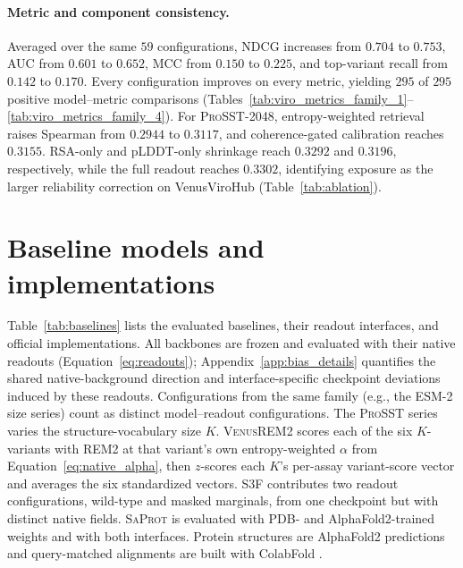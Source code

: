 \documentclass{article} %
\begin{document}
\paragraph{Metric and component consistency.}
Averaged over the same $59$ configurations, NDCG increases from $0.704$ to $0.753$, AUC from $0.601$ to $0.652$, MCC from $0.150$ to $0.225$, and top-variant recall from $0.142$ to $0.170$. Every configuration improves on every metric, yielding $295$ of $295$ positive model--metric comparisons (Tables~\ref{tab:viro_metrics_family_1}--\ref{tab:viro_metrics_family_4}). For \textsc{ProSST}-2048, entropy-weighted retrieval raises Spearman from $0.2944$ to $0.3117$, and coherence-gated calibration reaches $0.3155$. RSA-only and pLDDT-only shrinkage reach $0.3292$ and $0.3196$, respectively, while the full readout reaches $0.3302$, identifying exposure as the larger reliability correction on VenusViroHub (Table~\ref{tab:ablation}).

\FloatBarrier
\section{Baseline models and implementations}
\label{app:baselines}

Table~\ref{tab:baselines} lists the evaluated baselines, their readout interfaces, and official implementations. All backbones are frozen and evaluated with their native readouts (Equation~\ref{eq:readouts}); Appendix~\ref{app:bias_details} quantifies the shared native-background direction and interface-specific checkpoint deviations induced by these readouts. Configurations from the same family (e.g., the \textsc{ESM-2} size series) count as distinct model--readout configurations. The \textsc{ProSST} series varies the structure-vocabulary size $K$. \textsc{VenusREM2} scores each of the six $K$-variants with \textsc{REM2} at that variant's own entropy-weighted $\alpha$ from Equation~\ref{eq:native_alpha}, then $z$-scores each $K$'s per-assay variant-score vector and averages the six standardized vectors. \textsc{S3F} contributes two readout configurations, wild-type and masked marginals, from one checkpoint but with distinct native fields. \textsc{SaProt} is evaluated with PDB- and AlphaFold2-trained weights and with both interfaces. Protein structures are AlphaFold2 predictions \citep{jumper2021alphafold2} and query-matched alignments are built with ColabFold \citep{mirdita2022colabfold}.
\end{document}
